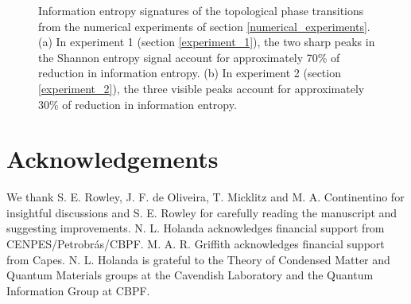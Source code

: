 \documentclass[10pt]{revtex4-1}
\begin{document}
\begin{figure}
\centering
{}\quad
{}\quad
\caption{Information entropy signatures of the topological phase transitions from the numerical experiments of section \ref{numerical_experiments}. (a) In experiment 1 (section \ref{experiment_1}), the two sharp peaks in the Shannon entropy signal account for approximately 70\% of reduction in information entropy. (b) In experiment 2 (section \ref{experiment_2}), the three visible peaks account for approximately 30\% of reduction in information entropy.}
\label{feature_importances}
\end{figure}

{}

\section*{Acknowledgements}

We thank S. E. Rowley, J. F. de Oliveira, T. Micklitz and M. A. Continentino for insightful discussions and S. E. Rowley for carefully reading the manuscript and suggesting improvements. N. L. Holanda acknowledges financial support from CENPES/Petrobr\'as/CBPF. M. A. R. Griffith acknowledges financial support from Capes. N. L. Holanda is grateful to the Theory of Condensed Matter and Quantum Materials groups at the Cavendish Laboratory and the Quantum Information Group at CBPF.
\end{document}

